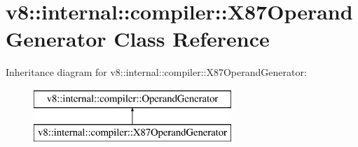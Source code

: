 \hypertarget{classv8_1_1internal_1_1compiler_1_1_x87_operand_generator}{}\section{v8\+:\+:internal\+:\+:compiler\+:\+:X87\+Operand\+Generator Class Reference}
\label{classv8_1_1internal_1_1compiler_1_1_x87_operand_generator}
Inheritance diagram for v8\+:\+:internal\+:\+:compiler\+:\+:X87\+Operand\+Generator\+:\begin{figure}[H]
\begin{center}
\leavevmode
\includegraphics[height=2.000000cm]{classv8_1_1internal_1_1compiler_1_1_x87_operand_generator}
\end{center}
\end{figure}
